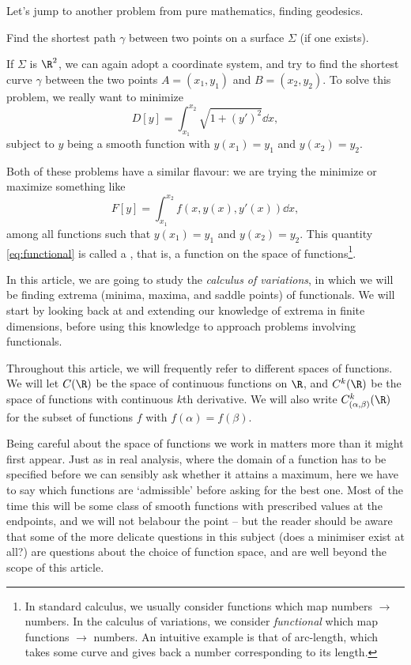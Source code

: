\documentclass[a4paper]{scrartcl}
\begin{document}
Let's jump to another problem from pure mathematics, finding geodesics.

\begin{example}
	Find the shortest path $\gamma$ between two points on a surface $\Sigma$ (if one exists).
\end{example}


If $\Sigma$ is $\R^2$, we can again adopt a coordinate system, and try to find the shortest curve $\gamma$ between the two points $A = (x_1, y_1)$ and $B=(x_2, y_2)$.
To solve this problem, we really want to minimize
$$
D[y] = \int_{x_1}^{x_2} \sqrt{1 + (y')^2} \dd{x},
$$
subject to $y$ being a smooth function with $y(x_1) = y_1$ and $y(x_2) = y_2$.

Both of these problems have a similar flavour: we are trying the minimize or maximize something like
\begin{equation}\label{eq:functional}
	F[y] = \int_{x_1}^{x_2} f(x, y(x), y'(x)) \dd x, \tag{$*$}
\end{equation}
among all functions such that $y(x_1) = y_1$ and $y(x_2) = y_2$.
This quantity \eqref{eq:functional} is called a , that is, a function on the space of functions\footnote{In standard calculus, we usually consider functions which map numbers $\rightarrow$ numbers. In the calculus of variations, we consider \emph{functional} which map functions $\rightarrow$ numbers. An intuitive example is that of arc-length, which takes some curve and gives back a number corresponding to its length.}.

In this article, we are going to study the \emph{calculus of variations}, in which we will be finding extrema (minima, maxima, and saddle points) of functionals. 
We will start by looking back at and extending our knowledge of extrema in finite dimensions, before using this knowledge to approach problems involving functionals.

\begin{notation}
	Throughout this article, we will frequently refer to different spaces of functions. We will let $C(\R)$ be the space of continuous functions on $\R$, and $C^k(\R)$ be the space of functions with continuous $k$th derivative. We will also write $C_{(\alpha, \beta)}^k(\R)$ for the subset of functions $f$ with $f(\alpha) = f(\beta)$.
\end{notation}

Being careful about the space of functions we work in matters more than it might first appear. Just as in real analysis, where the domain of a function has to be specified before we can sensibly ask whether it attains a maximum, here we have to say which functions are `admissible' before asking for the best one. Most of the time this will be some class of smooth functions with prescribed values at the endpoints, and we will not belabour the point -- but the reader should be aware that some of the more delicate questions in this subject (does a minimiser exist at all?) are questions about the choice of function space, and are well beyond the scope of this article.
\end{document}
